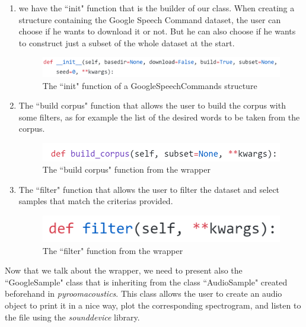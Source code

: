 \documentclass[11pt,a4paper,titlepage]{report}
\providecommand{\tightlist}{%
	\setlength{\itemsep}{0pt}\setlength{\parskip}{0pt}}
\begin{document}
\begin{enumerate}
	\tightlist
	\item  we have the ``init" function that is the builder of our class. When creating a structure containing the Google Speech Command dataset, the user can choose if he wants to download it or not. But he can also choose if he wants to construct just a subset of the whole dataset at the start.\\
	\begin{figure}[h!]
		\centering
		\includegraphics[width=0.95\linewidth]{Rapport5}
		\caption{The ``init" function of a GoogleSpeechCommands structure}
		\label{fig:rapport5}
	\end{figure}
	\item The ``build corpus" function that allows the user to build the corpus with some filters, as for example the list of the desired words to be taken from the corpus.\\
	\begin{figure}[h!]
		\centering
		\includegraphics[width=0.7\linewidth]{Rapport6}
		\caption{The ``build corpus" function from the wrapper}
		\label{fig:rapport6}
	\end{figure}
	\item The ``filter" function that allows the user to filter the dataset and select samples that match the criterias provided.\\
	\begin{figure}[h!]
		\centering
		\includegraphics[width=0.4\linewidth]{Rapport7}
		\caption{The ``filter" function from the wrapper}
		\label{fig:rapport7}
	\end{figure}
\end{enumerate}
\hspace*{0.6cm}
Now that we talk about the wrapper, we need to present also the ``GoogleSample" class that is inheriting from the class ``AudioSample" created beforehand in \textit{pyroomacoustics}. This class allows the user to create an audio object to print it in a nice way, plot the corresponding spectrogram, and listen to the file using the \emph{sounddevice} library.
\end{document}
